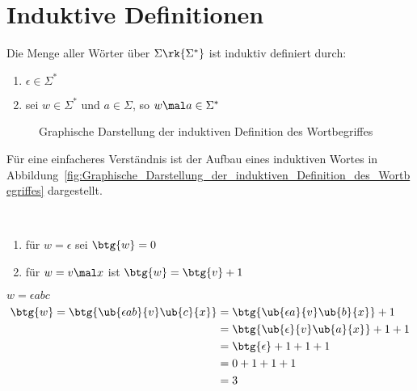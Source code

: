 \section{Induktive Definitionen}
\begin{definition}
Die Menge aller Wörter über $\Sigma \rk{\Sigma^*}$ ist induktiv definiert durch:
\begin{enumerate}
\item $\epsilon \in \Sigma^*$
\item sei $w \in \Sigma^*$ und $a \in \Sigma$, so $w \mal a \in \Sigma^*$
\end{enumerate}
\begin{figure}[htb]
\centering
{}
\caption{Graphische Darstellung der induktiven Definition des Wortbegriffes}
\label{fig:Graphische_Darstellung_der_induktiven_Definition_des_Wortbegriffes}
\end{figure}
Für eine einfacheres Verständnis ist der Aufbau eines induktiven Wortes in Abbildung~\vref{fig:Graphische_Darstellung_der_induktiven_Definition_des_Wortbegriffes} dargestellt.
\end{definition}

\begin{definition}~
\begin{enumerate}
\item für $w = \epsilon$ sei $\btg{w} = 0$
\item für $w = v \mal x$ ist $\btg{w} = \btg{v} + 1$
\end{enumerate}
\label{def:Induktive_Definition_der_Wortlaenge}
\end{definition}

\begin{example}
$w = \epsilon a b c$
\begin{align*}
\btg{w} = \btg{\ub{\epsilon a b}{v} \ub{c}{x}} &= \btg{\ub{\epsilon a}{v} \ub{b}{x}} + 1\\
&= \btg{\ub{\epsilon}{v} \ub{a}{x}} + 1 + 1\\
&= \btg{\epsilon} + 1 + 1 + 1\\
&= 0 + 1 + 1 + 1\\
&= 3
\end{align*}
\end{example}


